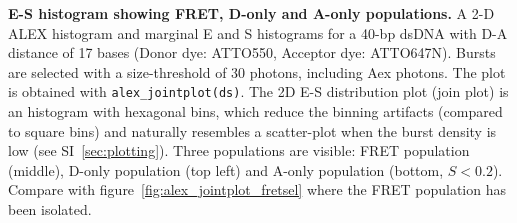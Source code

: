 \label{fig:alex_jointplot} \textbf{E-S histogram showing FRET, D-only and A-only populations.}
A 2-D ALEX histogram and marginal E and S histograms for a 40-bp dsDNA 
with D-A distance of 17 bases (Donor dye: ATTO550, Acceptor dye: ATTO647N). 
Bursts are selected with a size-threshold of 30 photons, including Aex photons. 
The plot is obtained with \texttt{alex\_jointplot(ds)}. The 2D E-S distribution plot (join plot)
is an histogram with hexagonal bins, which reduce the binning artifacts (compared to square bins)
and naturally resembles a scatter-plot when the burst density is low
(see SI~\ref{sec:plotting}).
Three populations are visible: FRET population (middle), D-only population (top left) and 
A-only population (bottom, $S < 0.2$). Compare with figure~\ref{fig:alex_jointplot_fretsel} 
where the FRET population has been isolated.
